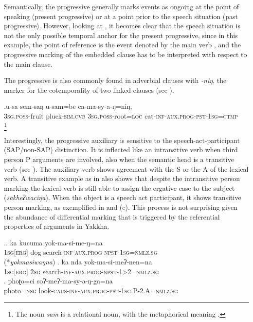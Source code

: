 Semantically, the progressive generally marks events as ongoing at the point of speaking (present progressive) or at a point prior to the speech situation (past progressive). However, looking at \Last[c], it becomes clear that the speech situation is not the only possible temporal anchor for the present progressive, since in this example, the  point of reference is the event denoted by the main verb , and the progressive marking of the embedded clause has to be interpreted with respect to the main clause.


The progressive is also commonly found in adverbial clauses with \emph{-niŋ}, the marker for the cotemporality of two linked clauses (see \Next). 

\exg.u-sa   sem-saŋ        u-sam=be               ca-ma-sy-a-ŋ=niŋ, \\
{\scshape 3sg.poss-}fruit pluck{\scshape -sim.cvb}  {\scshape 3sg.poss-}root{\scshape =loc} eat{\scshape -inf-aux.prog-pst-1sg=ctmp}\\
\footnote{The noun \emph{sam} is a relational noun,  with the metaphorical meaning .} 

Interestingly, the progressive auxiliary is sensitive to the speech-act-participant (SAP/non-SAP) distinction. It is inflected like an intransitive verb when  third person P arguments are involved, also when the semantic head is a transitive verb (see \Next[a]). The auxiliary verb shows  agreement with the S or the A of the lexical verb. A transitive example as in \LLast[c] also shows that despite the intransitive person marking  the lexical verb is still able to assign the ergative case to the subject (\emph{sakheʔwaciŋa}).  When the object is a speech act participant, it shows transitive person marking, as exemplified in \Next[b] and (c). This process is not surprising given the abundance of differential marking that is triggered by the referential properties of arguments in Yakkha.

\ex.\ag. ka kucuma yok-ma-si-me-ŋ=na\\
	{\scshape 1sg[erg]} dog search-{\scshape inf-aux.prog-npst-1sg=nmlz.sg}\\
	  (*\emph{yokmasiwaŋna})
\bg. ka nda yok-ma-si-meʔ-nen=na\\
{\scshape 1sg[erg]} {\scshape 2sg} search-{\scshape inf-aux.prog-npst-1>2=nmlz.sg}\\
\bg. phoʈo=ci soʔ-meʔ-ma-sy-a-ŋ-ga=na\\
photo{\scshape =nsg} look{\scshape -caus-inf-aux.prog-pst-1sg.P-2.A=nmlz.sg}\\

